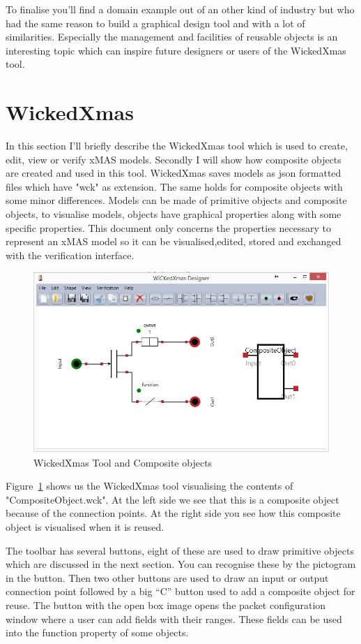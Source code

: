 \documentclass[a4paper,11pt,final]{article}
\begin{document}
To finalise you'll find a domain example out of an other kind of industry but
who had the same reason to build a graphical design tool and with a lot of
similarities.
Especially the management and facilities of reusable objects is an 
interesting topic which can inspire future designers or users of the
WickedXmas tool.

\newpage
\section{WickedXmas}
In this section I'll briefly describe the WickedXmas tool which is used
to create, edit, view or verify xMAS models. Secondly I will show how
composite objects are created and used in this tool.
WickedXmas saves models as json formatted files which have "wck" as
extension. The same holds for composite objects with some minor
differences. Models can be made of primitive objects and composite objects,
to visualise models, objects have graphical properties along with some
specific properties. 
This document only concerns the properties necessary to represent an
xMAS model so it can be visualised,edited, stored and exchanged with
the verification interface.

\begin{figure}[here]
\includegraphics[width=1.0\textwidth]{wxmCO}
\caption{WickedXmas Tool and Composite objects}
\label{fig:wxmCO}
\end{figure}
Figure~\ref{fig:wxmCO} shows us the WickedXmas tool visualising the contents
of "CompositeObject.wck". At the left side we see that this is a composite
object because of the connection points. At the right side you see how this 
composite object is visualised when it is reused.

The toolbar has several buttons, eight of these are used to draw
primitive objects which are discussed in the next section. You can recognise
these by the pictogram in the button. Then two other buttons are used to
draw an input or output connection point followed by a big ``C'' button
used to add a composite object for reuse.
The button with the open box image opens the packet configuration
window where a user can add fields with their ranges. These fields can be
used into the function property of some objects.
\end{document}
